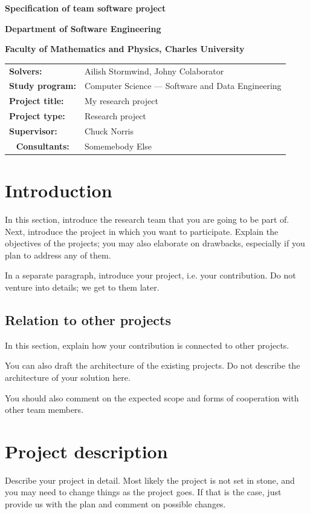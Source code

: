 \documentclass{article}
\title{\ProjectTitle}
\author{\StudentFullName}
\def\ResearchProject{Research project}
\def\StudentsFullName{Ailish Stormwind, Johny Colaborator}
\def\StudyProgram{Computer Science --- Software and Data Engineering}
\def\ProjectTitle{My research project}
\def\ProjectType{\ResearchProject}
\def\SupervisorFullName{Chuck Norris}
\def\ConsultantsFullName{Somemebody Else}
\begin{document}
\centerline{\Large \textbf{Specification of team software project}}
\centerline{ \textbf{Department of Software Engineering}}
\centerline{ \textbf{Faculty of Mathematics and Physics, Charles University}}
\bigskip
{\noindent\begin{tabular*}{\textwidth}{ >{\raggedleft}m{4cm} l}
 \textbf{Solvers:} & \StudentsFullName \\
 \textbf{Study program:} & \StudyProgram \\[1em]
 \textbf{Project title:} & \ProjectTitle \\
 \textbf{Project type:} & \ProjectType \\[1em]
 \textbf{Supervisor:} & \SupervisorFullName \\  
 \textbf{Consultants:} & \ConsultantsFullName \\
\end{tabular*}}

\section{Introduction}
In this section, introduce the research team that you are going to be part of.
Next, introduce the project in which you want to participate.
Explain the objectives of the projects; you may also elaborate on drawbacks, especially if you plan to address any of them.

In a separate paragraph, introduce your project, i.e. your contribution.
Do not venture into details; we get to them later.

\subsection{Relation to other projects}
In this section, explain how your contribution is connected to other projects.

You can also draft the architecture of the existing projects.
Do not describe the architecture of your solution here.

You should also comment on the expected scope and forms of cooperation with other team members.

\section{Project description}
Describe your project in detail.
Most likely the project is not set in stone, and you may need to change things as the project goes.
If that is the case, just provide us with the plan and comment on possible changes.
\end{document}
